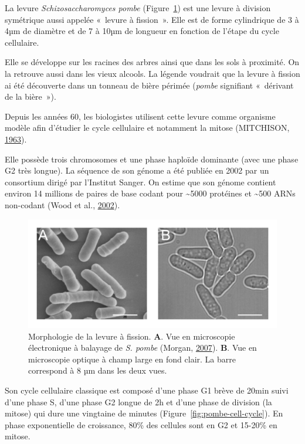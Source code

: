 \documentclass[12pt,a4paper,twoside,openright]{book}
\begin{document}
La levure \emph{Schizosaccharomyces pombe} (Figure~\ref{fig:pombe}) est
une levure à division symétrique aussi appelée «~levure à fission~».
Elle est de forme cylindrique de 3 à 4µm de diamètre et de 7 à 10µm de
longueur en fonction de l'étape du cycle cellulaire.

Elle se développe sur les racines des arbres ainsi que dans les sols à
proximité. On la retrouve aussi dans les vieux alcools. La légende
voudrait que la levure à fission ai été découverte dans un tonneau de
bière périmée (\emph{pombe} signifiant «~dérivant de la bière~»).

Depuis les années 60, les biologistes utilisent cette levure comme
organisme modèle afin d'étudier le cycle cellulaire et notamment la
mitose (MITCHISON, \protect\hyperlink{ref-MITCHISON1963}{1963}).

Elle possède trois chromosomes et une phase haploïde dominante (avec une
phase G2 très longue). La séquence de son génome a été publiée en 2002
par un consortium dirigé par l'Institut Sanger. On estime que son génome
contient environ 14 millions de paires de base codant pour
\textasciitilde{}5000 protéines et \textasciitilde{}500 ARNs non-codant
(Wood et al., \protect\hyperlink{ref-Wood2002a}{2002}).

\begin{figure}[htbp]
\centering
\includegraphics{figures/intro/pombe.png}
\caption[Morphologie de la levure à fission]{\label{fig:pombe}Morphologie
de la levure à fission. \textbf{A}. Vue en microscopie électronique à
balayage de \emph{S. pombe} (Morgan,
\protect\hyperlink{ref-Morgan2007}{2007}). \textbf{B}. Vue en
microscopie optique à champ large en fond clair. La barre correspond à 8
µm dans les deux vues.}
\end{figure}

Son cycle cellulaire classique est composé d'une phase G1 brève de 20min
suivi d'une phase S, d'une phase G2 longue de 2h et d'une phase de
division (la mitose) qui dure une vingtaine de minutes
(Figure~\ref{fig:pombe-cell-cycle}). En phase exponentielle de
croissance, 80\% des cellules sont en G2 et 15-20\% en mitose.
\end{document}
